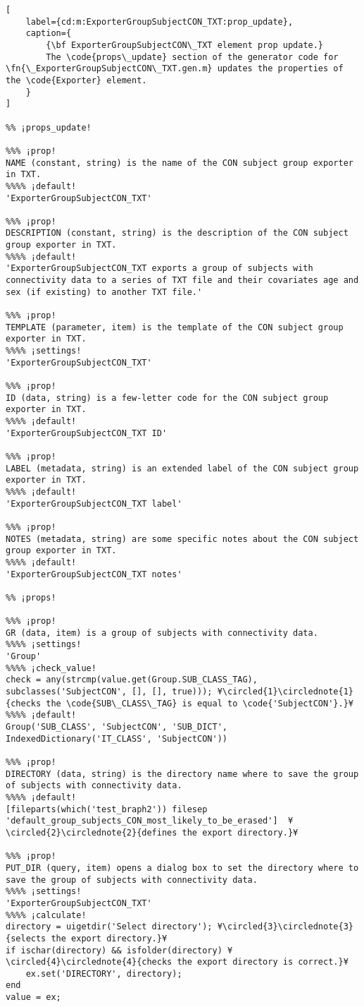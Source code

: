\documentclass{tufte-handout}
\begin{document}
\begin{lstlisting}[
	label={cd:m:ExporterGroupSubjectCON_TXT:prop_update},
	caption={
		{\bf ExporterGroupSubjectCON\_TXT element prop update.}
		The \code{props\_update} section of the generator code for \fn{\_ExporterGroupSubjectCON\_TXT.gen.m} updates the properties of the \code{Exporter} element.
	}
]

%% ¡props_update!

%%% ¡prop!
NAME (constant, string) is the name of the CON subject group exporter in TXT.
%%%% ¡default!
'ExporterGroupSubjectCON_TXT'

%%% ¡prop!
DESCRIPTION (constant, string) is the description of the CON subject group exporter in TXT.
%%%% ¡default!
'ExporterGroupSubjectCON_TXT exports a group of subjects with connectivity data to a series of TXT file and their covariates age and sex (if existing) to another TXT file.'

%%% ¡prop!
TEMPLATE (parameter, item) is the template of the CON subject group exporter in TXT.
%%%% ¡settings!
'ExporterGroupSubjectCON_TXT'

%%% ¡prop!
ID (data, string) is a few-letter code for the CON subject group exporter in TXT.
%%%% ¡default!
'ExporterGroupSubjectCON_TXT ID'

%%% ¡prop!
LABEL (metadata, string) is an extended label of the CON subject group exporter in TXT.
%%%% ¡default!
'ExporterGroupSubjectCON_TXT label'

%%% ¡prop!
NOTES (metadata, string) are some specific notes about the CON subject group exporter in TXT.
%%%% ¡default!
'ExporterGroupSubjectCON_TXT notes'

%% ¡props!

%%% ¡prop!
GR (data, item) is a group of subjects with connectivity data. 
%%%% ¡settings!
'Group'
%%%% ¡check_value!
check = any(strcmp(value.get(Group.SUB_CLASS_TAG), subclasses('SubjectCON', [], [], true))); ¥\circled{1}\circlednote{1}{checks the \code{SUB\_CLASS\_TAG} is equal to \code{'SubjectCON'}.}¥
%%%% ¡default!
Group('SUB_CLASS', 'SubjectCON', 'SUB_DICT', IndexedDictionary('IT_CLASS', 'SubjectCON'))

%%% ¡prop!
DIRECTORY (data, string) is the directory name where to save the group of subjects with connectivity data.
%%%% ¡default!
[fileparts(which('test_braph2')) filesep 'default_group_subjects_CON_most_likely_to_be_erased']  ¥\circled{2}\circlednote{2}{defines the export directory.}¥

%%% ¡prop!
PUT_DIR (query, item) opens a dialog box to set the directory where to save the group of subjects with connectivity data.
%%%% ¡settings!
'ExporterGroupSubjectCON_TXT'
%%%% ¡calculate!
directory = uigetdir('Select directory'); ¥\circled{3}\circlednote{3}{selects the export directory.}¥
if ischar(directory) && isfolder(directory) ¥\circled{4}\circlednote{4}{checks the export directory is correct.}¥
	ex.set('DIRECTORY', directory);
end
value = ex;


\end{lstlisting}
\end{document}
